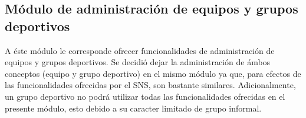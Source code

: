 \subsection{Módulo de administración de equipos y grupos deportivos}



A éste módulo le corresponde ofrecer funcionalidades de administración de equipos y grupos deportivos. Se decidió dejar la administración de ámbos conceptos (equipo y grupo deportivo) en el mismo módulo ya que, para efectos de las funcionalidades ofrecidas por el SNS, son bastante similares. Adicionalmente, un grupo deportivo no podrá utilizar todas las funcionalidades ofrecidas en el presente módulo, esto debido a su caracter limitado de grupo informal.
